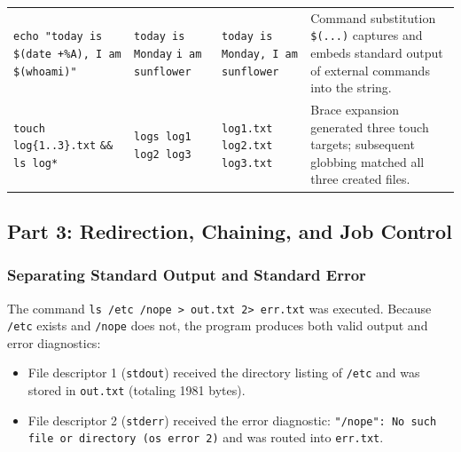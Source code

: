 \documentclass[12pt,a4paper]{article}
\begin{document}
\begin{table}[H]
\begin{tabularx}{\textwidth}{p{3.2cm} p{2.8cm} p{3.2cm} X}
\addlinespace
\texttt{echo "today is} \newline \texttt{\$(date +\%A), I am} \newline \texttt{\$(whoami)"} & \texttt{today is Monday} \newline \texttt{i am sunflower} & \texttt{today is Monday, I am sunflower} & Command substitution \texttt{\$(...)} captures and embeds standard output of external commands into the string. \\
\addlinespace
\texttt{touch log\{1..3\}.txt} \newline \texttt{\&\& ls log*} & \texttt{logs log1} \newline \texttt{log2 log3} & \texttt{log1.txt log2.txt} \newline \texttt{log3.txt} & Brace expansion generated three touch targets; subsequent globbing matched all three created files. \\
\bottomrule
\end{tabularx}
\end{table}

\subsection{Part 3: Redirection, Chaining, and Job Control}

\subsubsection{Separating Standard Output and Standard Error}
The command \texttt{ls /etc /nope > out.txt 2> err.txt} was executed. Because \texttt{/etc} exists and \texttt{/nope} does not, the program produces both valid output and error diagnostics:
\begin{itemize}
    \item File descriptor 1 (\texttt{stdout}) received the directory listing of \texttt{/etc} and was stored in \texttt{out.txt} (totaling 1981 bytes).
    \item File descriptor 2 (\texttt{stderr}) received the error diagnostic: \newline
    \texttt{"/nope": No such file or directory (os error 2)} and was routed into \texttt{err.txt}.
\end{itemize}
\end{document}
